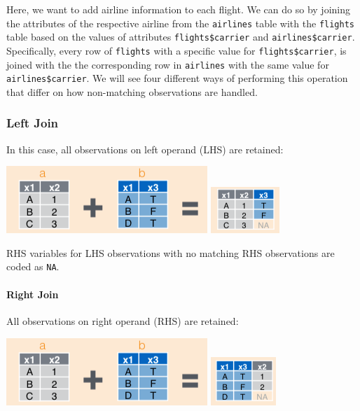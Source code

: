 \documentclass[]{article}
\newenvironment{Shaded}{\begin{snugshade}}{\end{snugshade}}
\newcommand{\KeywordTok}[1]{\textcolor[rgb]{0.13,0.29,0.53}{\textbf{{#1}}}}
\newcommand{\DataTypeTok}[1]{\textcolor[rgb]{0.13,0.29,0.53}{{#1}}}
\newcommand{\StringTok}[1]{\textcolor[rgb]{0.31,0.60,0.02}{{#1}}}
\newcommand{\NormalTok}[1]{{#1}}
\theoremstyle{definition}
\theoremstyle{definition}
\theoremstyle{remark}
\begin{document}
Here, we want to add airline information to each flight. We can do so by
joining the attributes of the respective airline from the
\texttt{airlines} table with the \texttt{flights} table based on the
values of attributes \texttt{flights\$carrier} and
\texttt{airlines\$carrier}. Specifically, every row of \texttt{flights}
with a specific value for \texttt{flights\$carrier}, is joined with the
the corresponding row in \texttt{airlines} with the same value for
\texttt{airlines\$carrier}. We will see four different ways of
performing this operation that differ on how non-matching observations
are handled.

\subsubsection{Left Join}\label{left-join}

In this case, all observations on left operand (LHS) are retained:

\includegraphics{img/join_lhs.png} \includegraphics{img/left_join.png}

\begin{Shaded}
\end{Shaded}

RHS variables for LHS observations with no matching RHS observations are
coded as \texttt{NA}.

\paragraph{Right Join}\label{right-join}

All observations on right operand (RHS) are retained:

\includegraphics{img/join_lhs.png} \includegraphics{img/right_join.png}
\end{document}
